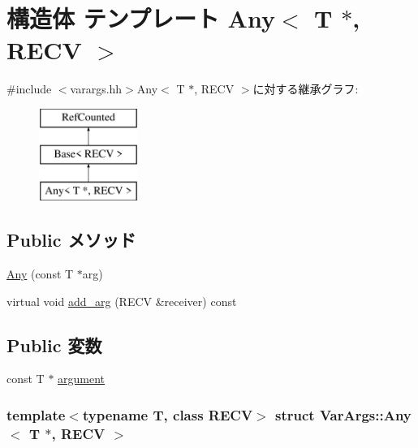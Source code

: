 \hypertarget{structVarArgs_1_1Any_3_01T_01_5_00_01RECV_01_4}{
\section{構造体 テンプレート Any$<$ T $\ast$, RECV $>$}
\label{structVarArgs_1_1Any_3_01T_01_5_00_01RECV_01_4}
}


{\ttfamily \#include $<$varargs.hh$>$}Any$<$ T $\ast$, RECV $>$に対する継承グラフ:\begin{figure}[H]
\begin{center}
\leavevmode
\includegraphics[height=3cm]{structVarArgs_1_1Any_3_01T_01_5_00_01RECV_01_4}
\end{center}
\end{figure}
\subsection*{Public メソッド}
\begin{DoxyCompactItemize}
\item 
\hyperlink{structVarArgs_1_1Any_3_01T_01_5_00_01RECV_01_4_a091fcc02dc3b751d9aa12b299a74802d}{Any} (const T $\ast$arg)
\item 
virtual void \hyperlink{structVarArgs_1_1Any_3_01T_01_5_00_01RECV_01_4_ab9c3a36cee779f61ec3d8d4d3db17f87}{add\_\-arg} (RECV \&receiver) const 
\end{DoxyCompactItemize}
\subsection*{Public 変数}
\begin{DoxyCompactItemize}
\item 
const T $\ast$ \hyperlink{structVarArgs_1_1Any_3_01T_01_5_00_01RECV_01_4_ac498d12221934e767f11d95a9a0ca7a9}{argument}
\end{DoxyCompactItemize}
\subsubsection*{template$<$typename T, class RECV$>$ struct VarArgs::Any$<$ T $\ast$, RECV $>$}



